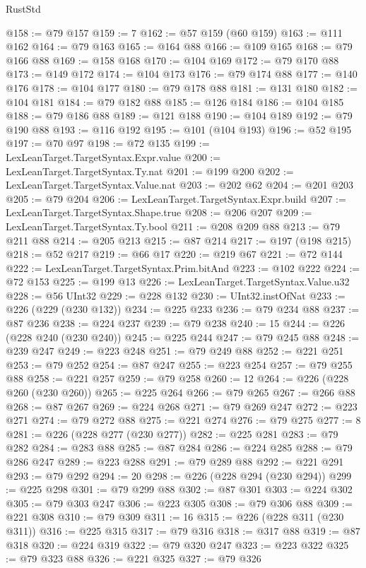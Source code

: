 \begin{lexlean}{RustStd}
\begin{coremodule}
@158 := @79 @157
@159 := 7
@162 := @57 @159 (@60 @159)
@163 := @111 @162
@164 := @79 @163
@165 := @164 @88
@166 := @109 @165
@168 := @79 @166 @88
@169 := @158 @168
@170 := @104 @169
@172 := @79 @170 @88
@173 := @149 @172
@174 := @104 @173
@176 := @79 @174 @88
@177 := @140 @176
@178 := @104 @177
@180 := @79 @178 @88
@181 := @131 @180
@182 := @104 @181
@184 := @79 @182 @88
@185 := @126 @184
@186 := @104 @185
@188 := @79 @186 @88
@189 := @121 @188
@190 := @104 @189
@192 := @79 @190 @88
@193 := @116 @192
@195 := @101 (@104 @193)
@196 := @52 @195
@197 := @70 @97
@198 := @72 @135
@199 := LexLeanTarget.TargetSyntax.Expr.value
@200 := LexLeanTarget.TargetSyntax.Ty.nat
@201 := @199 @200
@202 := LexLeanTarget.TargetSyntax.Value.nat
@203 := @202 @62
@204 := @201 @203
@205 := @79 @204
@206 := LexLeanTarget.TargetSyntax.Expr.build
@207 := LexLeanTarget.TargetSyntax.Shape.true
@208 := @206 @207
@209 := LexLeanTarget.TargetSyntax.Ty.bool
@211 := @208 @209 @88
@213 := @79 @211 @88
@214 := @205 @213
@215 := @87 @214
@217 := @197 (@198 @215)
@218 := @52 @217
@219 := @66 @17
@220 := @219 @67
@221 := @72 @144
@222 := LexLeanTarget.TargetSyntax.Prim.bitAnd
@223 := @102 @222
@224 := @72 @153
@225 := @199 @13
@226 := LexLeanTarget.TargetSyntax.Value.u32
@228 := @56 UInt32
@229 := @228 @132
@230 := UInt32.instOfNat
@233 := @226 (@229 (@230 @132))
@234 := @225 @233
@236 := @79 @234 @88
@237 := @87 @236
@238 := @224 @237
@239 := @79 @238
@240 := 15
@244 := @226 (@228 @240 (@230 @240))
@245 := @225 @244
@247 := @79 @245 @88
@248 := @239 @247
@249 := @223 @248
@251 := @79 @249 @88
@252 := @221 @251
@253 := @79 @252
@254 := @87 @247
@255 := @223 @254
@257 := @79 @255 @88
@258 := @221 @257
@259 := @79 @258
@260 := 12
@264 := @226 (@228 @260 (@230 @260))
@265 := @225 @264
@266 := @79 @265
@267 := @266 @88
@268 := @87 @267
@269 := @224 @268
@271 := @79 @269 @247
@272 := @223 @271
@274 := @79 @272 @88
@275 := @221 @274
@276 := @79 @275
@277 := 8
@281 := @226 (@228 @277 (@230 @277))
@282 := @225 @281
@283 := @79 @282
@284 := @283 @88
@285 := @87 @284
@286 := @224 @285
@288 := @79 @286 @247
@289 := @223 @288
@291 := @79 @289 @88
@292 := @221 @291
@293 := @79 @292
@294 := 20
@298 := @226 (@228 @294 (@230 @294))
@299 := @225 @298
@301 := @79 @299 @88
@302 := @87 @301
@303 := @224 @302
@305 := @79 @303 @247
@306 := @223 @305
@308 := @79 @306 @88
@309 := @221 @308
@310 := @79 @309
@311 := 16
@315 := @226 (@228 @311 (@230 @311))
@316 := @225 @315
@317 := @79 @316
@318 := @317 @88
@319 := @87 @318
@320 := @224 @319
@322 := @79 @320 @247
@323 := @223 @322
@325 := @79 @323 @88
@326 := @221 @325
@327 := @79 @326

\end{coremodule}
\end{lexlean}
